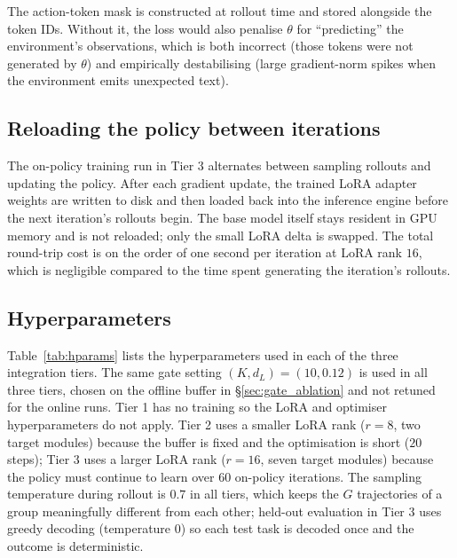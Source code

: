\documentclass{article}
\begin{document}
The action-token mask is constructed at rollout time and stored
alongside the token IDs. Without it, the loss would also penalise
$\theta$ for ``predicting'' the environment's observations, which is
both incorrect (those tokens were not generated by $\theta$) and
empirically destabilising (large gradient-norm spikes when the
environment emits unexpected text).

\subsection{Reloading the policy between iterations}
\label{app:lora_hotswap}

The on-policy training run in Tier 3 alternates between sampling
rollouts and updating the policy. After each gradient update, the
trained LoRA adapter weights are written to disk and then loaded
back into the inference engine before the next iteration's
rollouts begin. The base model itself stays resident in GPU
memory and is not reloaded; only the small LoRA delta is
swapped. The total round-trip cost is on the order of one second
per iteration at LoRA rank $16$, which is negligible compared to
the time spent generating the iteration's rollouts.

\subsection{Hyperparameters}
\label{app:hparams}

Table~\ref{tab:hparams} lists the hyperparameters used in each
of the three integration tiers. The same gate setting
$(K, d_L) = (10, 0.12)$ is used in all three tiers, chosen on the
offline buffer in \S\ref{sec:gate_ablation} and not retuned for
the online runs. Tier 1 has no training so the LoRA and optimiser
hyperparameters do not apply. Tier 2 uses a smaller LoRA rank
($r = 8$, two target modules) because the buffer is fixed and
the optimisation is short ($20$ steps); Tier 3 uses a larger
LoRA rank ($r = 16$, seven target modules) because the policy
must continue to learn over $60$ on-policy iterations. The
sampling temperature during rollout is $0.7$ in all tiers, which
keeps the $G$ trajectories of a group meaningfully different from
each other; held-out evaluation in Tier 3 uses greedy decoding
(temperature $0$) so each test task is decoded once and the
outcome is deterministic.
\end{document}
